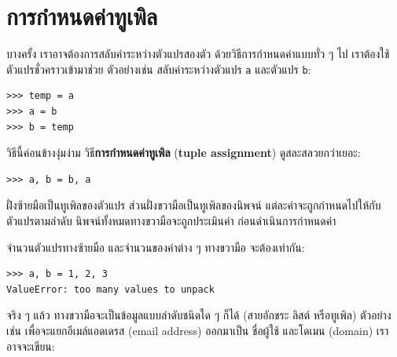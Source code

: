 \section{การกำหนดค่าทูเพิล}
\label{tuple.assignment}


บางครั้ง เราอาจต้องการสลับค่าระหว่างตัวแปรสองตัว
ด้วยวิธีการกำหนดค่าแบบทั่ว ๆ ไป
เราต้องใช้ตัวแปรชั่วคราวเข้ามาช่วย
ตัวอย่างเช่น สลับค่าระหว่างตัวแปร \texttt{a} และตัวแปร \texttt{b}:

\begin{verbatim}
>>> temp = a
>>> a = b
>>> b = temp
\end{verbatim}
%
%
วิธีนี้ค่อนข้างงุ่มง่าม
วิธี\textbf{การกำหนดค่าทูเพิล} (\textbf{tuple assignment}) ดูสละสลวยกว่าเยอะ:

\begin{verbatim}
>>> a, b = b, a
\end{verbatim}
%
%
ฝั่งซ้ายมือเป็นทูเพิลของตัวแปร
ส่วนฝั่งขวามือเป็นทูเพิลของนิพจน์
แต่ละค่าจะถูกกำหนดไปให้กับตัวแปรตามลำดับ
นิพจน์ทั้งหมดทางขวามือจะถูกประเมินค่า ก่อนดำเนินการกำหนดค่า


จำนวนตัวแปรทางซ้ายมือ และจำนวนของค่าต่าง ๆ ทางขวามือ จะต้องเท่ากัน:

\begin{verbatim}
>>> a, b = 1, 2, 3
ValueError: too many values to unpack
\end{verbatim}
%
%
จริง ๆ แล้ว ทางขวามือจะเป็นข้อมูลแบบลำดับชนิดใด ๆ ก็ได้ (สายอักขระ ลิสต์ หรือทูเพิล)
ตัวอย่าง เช่น เพื่อจะแยกอีเมล์แอดเดรส (email address) ออกมาเป็น ชื่อผู้ใช้ และโดเมน (domain) เราอาจจะเขียน:

